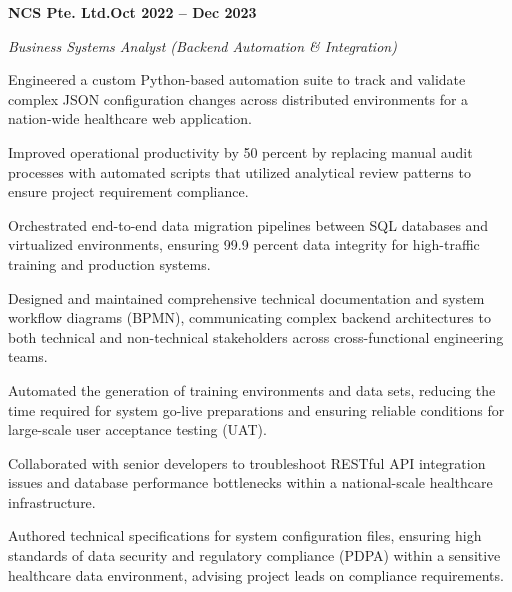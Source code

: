 \documentclass[letterpaper,10pt]{article}
\newcommand{\headingBf}[2]{\par\noindent\hspace*{10pt}\textbf{#1}\hfill\textbf{#2}}
\newcommand{\headingIt}[2]{\par\noindent\hspace*{10pt}\textit{#1}\hfill\textit{#2}}
\newenvironment{resume_list}{\vspace{-7pt}\begin{itemize}[itemsep=-2px, parsep=1pt, leftmargin=30pt]}{\end{itemize}}
\begin{document}
  \headingBf{NCS Pte. Ltd.}{Oct 2022 -- Dec 2023}
  \headingIt{Business Systems Analyst (Backend Automation \& Integration)}{}
  \begin{resume_list}
    \item Engineered a custom Python-based automation suite to track and validate complex JSON configuration changes across distributed environments for a nation-wide healthcare web application.
    \item Improved operational productivity by 50 percent by replacing manual audit processes with automated scripts that utilized analytical review patterns to ensure project requirement compliance.
    \item Orchestrated end-to-end data migration pipelines between SQL databases and virtualized environments, ensuring 99.9 percent data integrity for high-traffic training and production systems.
    \item Designed and maintained comprehensive technical documentation and system workflow diagrams (BPMN), communicating complex backend architectures to both technical and non-technical stakeholders across cross-functional engineering teams.
    \item Automated the generation of training environments and data sets, reducing the time required for system go-live preparations and ensuring reliable conditions for large-scale user acceptance testing (UAT).
    \item Collaborated with senior developers to troubleshoot RESTful API integration issues and database performance bottlenecks within a national-scale healthcare infrastructure.
    \item Authored technical specifications for system configuration files, ensuring high standards of data security and regulatory compliance (PDPA) within a sensitive healthcare data environment, advising project leads on compliance requirements.
  \end{resume_list}
\end{document}
